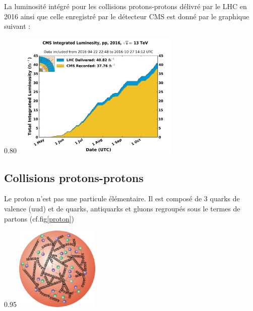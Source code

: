 La luminosité intégré pour les collisions protons-protons délivré par le LHC en 2016 ainsi que celle enregistré par  le détecteur CMS est donné par le graphique suivant :

\begin{minipagewithmarginpars}[ht!]{0.80\textwidth}
\centering
\includegraphics[width=0.6\textwidth]{LHC/luminosity.png}
\end{minipagewithmarginpars}

\subsection{Collisions protons-protons}
Le proton n'est pas une particule élémentaire. Il est composé de 3 quarks de valence (uud) et de quarks, antiquarks et gluons regroupés sous le termes de partons (cf.fig\ref{proton})

\begin{minipagewithmarginpars}[h]{0.95\textwidth}
\centering
\includegraphics[width=0.3\textwidth]{SM/quarks3.png}
\label{proton}	
\end{minipagewithmarginpars}

